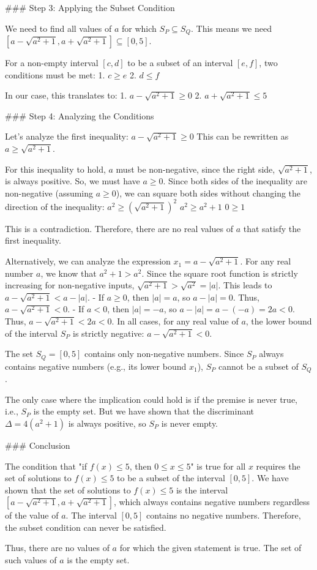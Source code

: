 ### Step 3: Applying the Subset Condition

We need to find all values of $a$ for which $S_P \subseteq S_Q$.
This means we need $[a - \sqrt{a^2+1}, a + \sqrt{a^2+1}] \subseteq [0, 5]$.

For a non-empty interval $[c, d]$ to be a subset of an interval $[e, f]$, two conditions must be met:
1. $c \ge e$
2. $d \le f$

In our case, this translates to:
1. $a - \sqrt{a^2+1} \ge 0$
2. $a + \sqrt{a^2+1} \le 5$

### Step 4: Analyzing the Conditions

Let's analyze the first inequality:
$a - \sqrt{a^2+1} \ge 0$
This can be rewritten as $a \ge \sqrt{a^2+1}$.

For this inequality to hold, $a$ must be non-negative, since the right side, $\sqrt{a^2+1}$, is always positive. So, we must have $a \ge 0$.
Since both sides of the inequality are non-negative (assuming $a \ge 0$), we can square both sides without changing the direction of the inequality:
$a^2 \ge (\sqrt{a^2+1})^2$
$a^2 \ge a^2 + 1$
$0 \ge 1$

This is a contradiction. Therefore, there are no real values of $a$ that satisfy the first inequality.

Alternatively, we can analyze the expression $x_1 = a - \sqrt{a^2+1}$. For any real number $a$, we know that $a^2+1 > a^2$. Since the square root function is strictly increasing for non-negative inputs, $\sqrt{a^2+1} > \sqrt{a^2} = |a|$.
This leads to $a - \sqrt{a^2+1} < a - |a|$.
- If $a \ge 0$, then $|a|=a$, so $a - |a| = 0$. Thus, $a - \sqrt{a^2+1} < 0$.
- If $a < 0$, then $|a|=-a$, so $a - |a| = a - (-a) = 2a < 0$. Thus, $a - \sqrt{a^2+1} < 2a < 0$.
In all cases, for any real value of $a$, the lower bound of the interval $S_P$ is strictly negative: $a - \sqrt{a^2+1} < 0$.

The set $S_Q = [0, 5]$ contains only non-negative numbers. Since $S_P$ always contains negative numbers (e.g., its lower bound $x_1$), $S_P$ cannot be a subset of $S_Q$.

The only case where the implication could hold is if the premise is never true, i.e., $S_P$ is the empty set. But we have shown that the discriminant $\Delta = 4(a^2+1)$ is always positive, so $S_P$ is never empty.

### Conclusion

The condition that "if $f(x) \le 5$, then $0 \le x \le 5$" is true for all $x$ requires the set of solutions to $f(x) \le 5$ to be a subset of the interval $[0, 5]$. We have shown that the set of solutions to $f(x) \le 5$ is the interval $[a - \sqrt{a^2+1}, a + \sqrt{a^2+1}]$, which always contains negative numbers regardless of the value of $a$. The interval $[0, 5]$ contains no negative numbers. Therefore, the subset condition can never be satisfied.

Thus, there are no values of $a$ for which the given statement is true. The set of such values of $a$ is the empty set.
